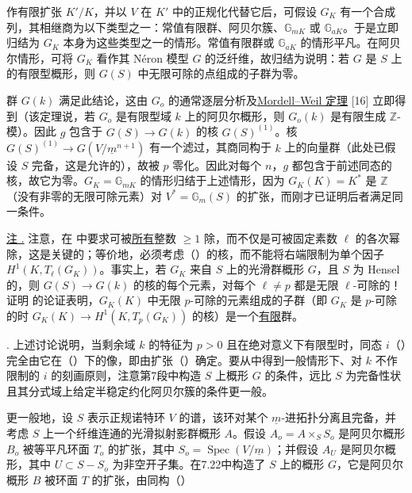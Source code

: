 作有限扩张 $K'/K$，并以 $V$ 在 $K'$ 中的正规化代替它后，可假设 $G_K$ 有一个合成列，其相继商为以下类型之一：常值有限群、阿贝尔簇、$\mathbb G_{mK}$ 或 $\mathbb G_{aK}$。于是立即归结为 $G_K$ 本身为这些类型之一的情形。常值有限群或 $\mathbb G_{aK}$ 的情形平凡。在阿贝尔情形，可将 $G_K$ 看作其 N\'{e}ron 模型 $G$ 的泛纤维，故归结为说明：若 $G$ 是 $S$ 上的有限型概形，则 $G(S)$ 中无限可除的点组成的子群为零。

群 $G(k)$ 满足此结论，这由 $G_o$ 的通常逐层分析及\underline{Mordell--Weil 定理} [16] 立即得到（该定理说，若 $G_o$ 是有限型域 $k$ 上的阿贝尔概形，则 $G_o(k)$ 是有限生成 $\mathbb Z$-模）。因此 $g$ 包含于 $G(S)\longrightarrow G(k)$ 的核 $G(S)^{(1)}$。核 $G(S)^{(1)}\longrightarrow G(V/\underline m^{n+1})$ 有一个滤过，其商同构于 $k$ 上的向量群（此处已假设 $S$ 完备，这是允许的），故被 $p$ 零化。因此对每个 $n$，$g$ 都包含于前述同态的核，故它为零。$G_K=\mathbb G_{mK}$ 的情形归结于上述情形，因为 $G_K(K)=K^*$ 是 $\mathbb Z$（没有非零的无限可除元素）对 $V^*=\mathbb G_m(S)$ 的扩张，而刚才已证明后者满足同一条件。

\medskip
\noindent
\underline{注 .} 注意，在  中要求可被\underline{所有}整数 $\geq1$ 除，而不仅是可被固定素数 $\ell$ 的各次幂除，这是关键的；等价地，必须考虑（）的核，而不能将右端限制为单个因子 $H^1(K,T_\ell(G_K))$。事实上，若 $G_K$ 来自 $S$ 上的光滑群概形 $G$，且 $S$ 为 Hensel 的，则 $G(S)\longrightarrow G(k)$ 的核的每个元素，对每个 $\ell\neq p$ 都是无限 $\ell$-可除的！证明  的论证表明，$G_K(K)$ 中无限 $p$-可除的元素组成的子群（即 $G_K$ 是 $p$-可除的时 $G_K(K)\longrightarrow H^1(K,T_p(G_K))$ 的核）是一个\underline{有限}群。

\medskip
\noindent
{}. 上述讨论说明，当剩余域 $k$ 的特征为 $p>0$ 且在绝对意义下有限型时，同态 $i$（）完全由它在（）下的像，即由扩张（）确定。要从中得到一般情形下、对 $k$ 不作限制的 $i$ 的刻画原则，注意第7段中构造 $S$ 上概形 $G$ 的条件，远比 $S$ 为完备性状且其分式域上给定半稳定约化阿贝尔簇的条件更一般。

更一般地，设 $S$ 表示正规诺特环 $V$ 的谱，该环对某个 $\underline m$-进拓扑分离且完备，并考虑 $S$ 上一个纤维连通的光滑拟射影群概形 $A$。假设 $A_o=A\times_S S_o$ 是阿贝尔概形 $B_o$ 被等平凡环面 $T_o$ 的扩张，其中 $S_o=\operatorname{Spec}(V/\underline m)$；并假设 $A_U$ 是阿贝尔概形，其中 $U\subset S-S_o$ 为非空开子集。在7.22中构造了 $S$ 上的概形 $G$，它是阿贝尔概形 $B$ 被环面 $T$ 的扩张，由同构（）

